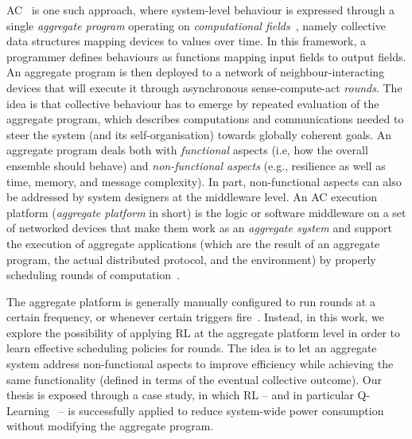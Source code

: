 \ac{AC}~\cite{DBLP:journals/computer/BealPV15}
 is one such approach,
 where system-level behaviour 
 is expressed through a single \emph{aggregate program} operating on \emph{computational fields}~\cite{DBLP:journals/jlap/ViroliBDACP19}, namely collective data structures mapping devices to values over time.
%
In this framework,
 a programmer defines behaviours
 as functions mapping input fields to output fields.
%
An aggregate program is then deployed
 to a network of neighbour-interacting devices
 that will execute it 
 through asynchronous sense-compute-act \emph{rounds}.
%
%
The idea is that collective behaviour 
 has to emerge by repeated evaluation of the aggregate program,
 which describes computations and communications
 needed to steer the system (and its self-organisation)
 towards globally coherent goals.
%
An aggregate program deals both with \emph{functional} aspects (i.e, how the overall ensemble should behave) 
 and \emph{non-functional aspects} (e.g., resilience as well as time, memory, and message complexity).
%
In part, non-functional aspects 
 can also be addressed by system designers
 at the middleware level.
%
An \ac{AC} execution platform (\emph{aggregate platform} in short) is the logic or software middleware 
 on a set of networked devices 
 that make them work as an \emph{aggregate system}
 and support the execution of aggregate applications (which are the result of an aggregate program, the actual distributed protocol, and the environment) by properly scheduling rounds of computation~\cite{DBLP:journals/fi/CasadeiPPVW20}. 

The aggregate platform is generally manually configured to run rounds at a certain frequency, or whenever certain triggers fire~\cite{danilo2021lmcs}.
%
Instead, in this work, we explore the possibility of applying \ac{RL} at the aggregate platform level
 in order to learn effective scheduling policies for rounds.
%
The idea is to let an aggregate system
 address non-functional aspects  
 to improve efficiency %
 while 
 achieving the same functionality
 (defined in terms of the eventual collective outcome). 
%
Our thesis is exposed through a case study, in which \ac{RL} -- and in particular Q-Learning~\cite{DBLP:conf/icml/LauerR00} -- is successfully applied to reduce system-wide power consumption without modifying the aggregate program.   

